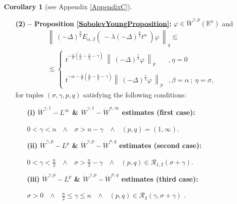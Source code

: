 \documentclass{amsart}
\theoremstyle{definition}
\newtheorem{corollary}[theorem]{Corollary}
\theoremstyle{remark}
\numberwithin{equation}{section}
\newcommand{\BR}{{\mathbb R}}
\begin{document}
\begin{corollary}[see Appendix {\ref{AppendixC}}]
\begin{itemize}
\begin{itemize}
			\begin{center}
				$\sigma>n$~~$\wedge$~~$(p,q)=(1,\infty)$;
			\end{center}
			\item[{\bf (b)}] {\bf $L^p-L^q$ \& $L^p-\dot{W}^{\sigma,q}$ estimates (second case):} 
			\begin{center}
				$\displaystyle \sigma>\frac{n}{2}$~~$\wedge$~~$(p,q)\in \mathcal{R}_{1,2}(\sigma)$~[~see eq. (\ref{Ogamma12})~].
			\end{center}
		\end{itemize}
		\item[\bf (2)] {\bf -- Proposition \ref{SobolevYoungProposition}:} $\varphi\in \dot{W}^{\gamma,p}(\BR^n)$  and \begin{eqnarray}
			\label{CaseIVIIIEstimates}
			\left\|~ (-\Delta)^{\frac{\eta}{2}}E_{\alpha,\beta}\left(~-\lambda(-\Delta)^{\frac{\sigma}{2}} t^\alpha~\right)\varphi~\right\|_q \lesssim \nonumber \\  \lesssim \begin{cases}
				\displaystyle t^{-\frac{\alpha}{\sigma}\left(\frac{n}{p}-\frac{n}{q}-\gamma\right)}~
				\left\|~(-\Delta)^{\frac{\gamma}{2}}\varphi~\right\|_p &, \eta=0\\  \ \\
				\displaystyle t^{-\alpha-\frac{\alpha}{\sigma}\left(\frac{n}{p}-\frac{n}{q}-\gamma\right)}
				\left\|~(-\Delta)^{\frac{\gamma}{2}}\varphi~\right\|_p &, \beta=\alpha~;~\eta=\sigma,
			\end{cases}
		\end{eqnarray} 	
		for tuples $(\sigma,\gamma,p,q)$ satisfying the following conditions:
		\begin{itemize}
			\item[{\bf (i)}] {\bf $\dot{W}^{\gamma,1}-L^\infty$ \& $\dot{W}^{\gamma,1}-\dot{W}^{\sigma,\infty}$ estimates (first case):} 
			\begin{center}
				$0<\gamma< n$~~$\wedge$~~$\sigma>n-\gamma$~~$\wedge$~~$(p,q)=(1,\infty)$.
			\end{center}
			\item[{\bf (ii)}] {\bf $\dot{W}^{\gamma,p}-L^p$ \& $\dot{W}^{\gamma,p}-\dot{W}^{\sigma,q}$ estimates (second case):} 
			\begin{center}
				$\displaystyle 0<\gamma< \frac{n}{2}$~~$\wedge$~~$\displaystyle \sigma>\frac{n}{2}-\gamma$~~$\wedge$~~$(p,q)\in \mathcal{R}_{1,2}(\sigma+\gamma)$.
			\end{center}
			\item[{\bf (iii)}]{\bf $\dot{W}^{\gamma,p}-L^p$ \& $\dot{W}^{\gamma,p}-\dot{W}^{\sigma,q}$ estimates (third case):} 
			\begin{center}
				$\sigma>0$~~$\wedge$~~$\displaystyle \frac{n}{2}\leq \gamma\leq n$~~$\wedge$~~$(p,q)\in \mathcal{R}_{3}(\gamma,\sigma+\gamma)$ . 
			\end{center}
		\end{itemize}
	\end{itemize}
\end{corollary}
\end{document}
